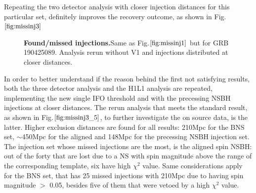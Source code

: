 \documentclass[binding=0.6cm, LaM]{sapthesis}
\begin{document}
	Repeating the two detector analysis with closer injection distances for this particular set, 
	definitely improves the recovery outcome, as shown in Fig.$\ref{fig:missinj3}$
                \begin{figure}[h]
                        \noindent
                        \label{missinj3}
                        \centering
                        \caption{\textbf{Found/missed injections.}Same as Fig.$\ref{fig:missinj1}$ but for GRB 190425089. Analysis rerun without V1 and injections distributed at closer distances.}
                        \label{fig:missinj3}
                \end{figure}
	In order to better understand if the reason behind the first not satisfying results,
	both the three detector analysis and the H1L1 analysis are repeated, 
	implementing the new single IFO threshold and with the precessing NSBH injections at closer distances.
	The rerun analysis that meets the standard result, as shown in Fig.$\ref{fig:missinj3_5}$,
	to further investigate the on source data, is the latter.
	Higher exclusion distances are found for all results: 
	210Mpc for the BNS set, $\sim$450Mpc for the aligned and 148Mpc for the precessing NSBH injection set.
	The injection set whose missed injections are  the most, is the  aligned spin NSBH:
	out of the forty that are lost due to a NS  with  spin magnitude above the range of the corresponding template,
	six have high $\chi^2$ value.
	Same considerations apply for the BNS set, that has 25 missed injections with 210Mpc due to having spin magnitude $>$ 0.05,
	besides five of  them that were vetoed by a high $\chi^2$ value. 
\end{document}
